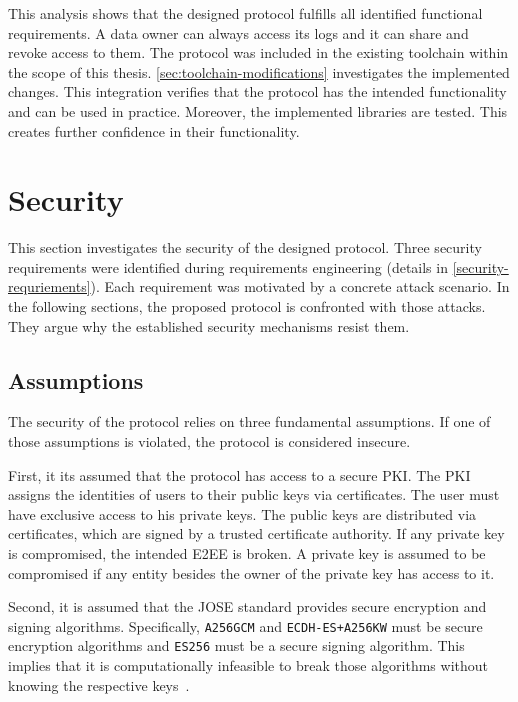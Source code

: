 \documentclass[../main.tex]{subfiles}
\begin{document}
This analysis shows that the designed protocol fulfills all identified functional requirements.
A data owner can always access its logs and it can share and revoke access to them.
The protocol was included in the existing toolchain within the scope of this thesis.
\cref{sec:toolchain-modifications} investigates the implemented changes.
This integration verifies that the protocol has the intended functionality and can be used in practice.
Moreover, the implemented libraries are tested.
This creates further confidence in their functionality.

\section{Security}
\label{sec:evaluation-sec}

This section investigates the security of the designed protocol.
Three security requirements were identified during requirements engineering (details in \cref{security-requriements}).
Each requirement was motivated by a concrete attack scenario.
In the following sections, the proposed protocol is confronted with those attacks.
They argue why the established security mechanisms resist them.

\subsection{Assumptions}

The security of the protocol relies on three fundamental assumptions.
If one of those assumptions is violated, the protocol is considered insecure.

First, it its assumed that the protocol has access to a secure PKI.
The PKI assigns the identities of users to their public keys via certificates.
The user must have exclusive access to his private keys.
The public keys are distributed via certificates, which are signed by a trusted certificate authority.
If any private key is compromised, the intended E2EE is broken.
A private key is assumed to be compromised if any entity besides the owner of the private key has access to it.

Second, it is assumed that the JOSE standard provides secure encryption and signing algorithms.
Specifically, \verb|A256GCM| and \verb|ECDH-ES+A256KW| must be secure encryption algorithms and \verb|ES256| must be a secure signing algorithm.
This implies that it is computationally infeasible to break those algorithms without knowing the respective keys~\cite{Katz2020}.
\end{document}
